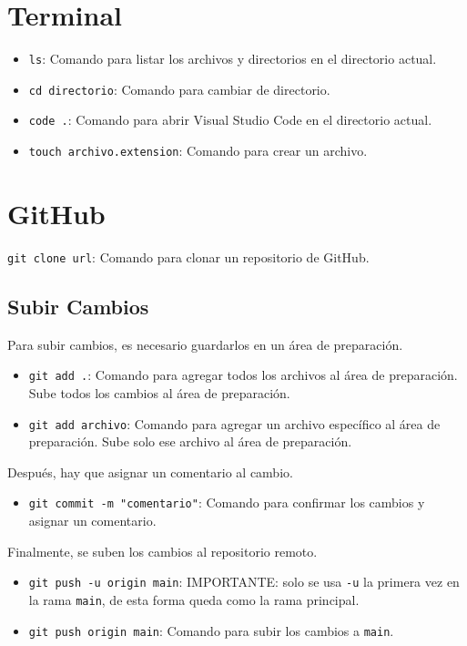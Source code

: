 \documentclass{article} %
\begin{document}
\section{Terminal}

\begin{itemize}
    \item \texttt{ls}: Comando para listar los archivos y directorios en el directorio actual.
    \item \texttt{cd directorio}: Comando para cambiar de directorio.
    \item \texttt{code .}: Comando para abrir Visual Studio Code en el directorio actual.
    \item \texttt{touch archivo.extension}: Comando para crear un archivo.
\end{itemize}

\section{GitHub}

\texttt{git clone url}: Comando para clonar un repositorio de GitHub.

\subsection{Subir Cambios}

Para subir cambios, es necesario guardarlos en un área de preparación.

\begin{itemize}
    \item \texttt{git add .}: Comando para agregar todos los archivos al área de preparación. Sube todos los cambios al área de preparación.
    \item \texttt{git add archivo}: Comando para agregar un archivo específico al área de preparación. Sube solo ese archivo al área de preparación.
\end{itemize}

Después, hay que asignar un comentario al cambio.

\begin{itemize}
    \item \texttt{git commit -m "comentario"}: Comando para confirmar los cambios y asignar un comentario.
\end{itemize}

Finalmente, se suben los cambios al repositorio remoto.

\begin{itemize}
    \item \texttt{git push -u origin main}: IMPORTANTE: solo se usa \texttt{-u} la primera vez en la rama \texttt{main}, de esta forma queda como la rama principal.
    \item \texttt{git push origin main}: Comando para subir los cambios a \texttt{main}.
\end{itemize}
\end{document}
